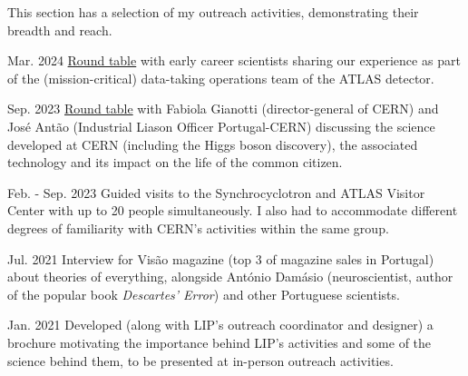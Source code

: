
This section has a selection of my outreach activities, demonstrating their breadth and reach.

\begin{cventries}
    
    {}{Mar. 2024}
    {\href{https://indico.cern.ch/event/1378416/overview}{Round table} with early career scientists sharing our experience as part of the (mission-critical) data-taking operations team of the ATLAS detector.}

    {}{Sep. 2023}
    {\href{https://www.cienciaviva.pt/divulgacao-cientifica/o-bosao-de-higgs-e-as-nossas-vidas}{Round table} with Fabiola Gianotti (director-general of CERN) and José Antão (Industrial Liason Officer Portugal-CERN) discussing the science developed at CERN (including the Higgs boson discovery), the associated technology and its impact on the life of the common citizen.}

    {}{Feb. - Sep. 2023}
    {Guided visits to the Synchrocyclotron and ATLAS Visitor Center with up to 20 people simultaneously. I also had to accommodate different degrees of familiarity with CERN's activities within the same group.}

    {}{Jul. 2021}
    {Interview for Visão magazine (top 3 of magazine sales in Portugal) about theories of everything, alongside António Damásio (neuroscientist, author of the popular book \textit{Descartes' Error}) and other Portuguese scientists.}

    {}{Jan. 2021}
    {Developed (along with LIP's outreach coordinator and designer) a brochure motivating the importance behind LIP's activities and some of the science behind them, to be presented at in-person outreach activities.}

\end{cventries}